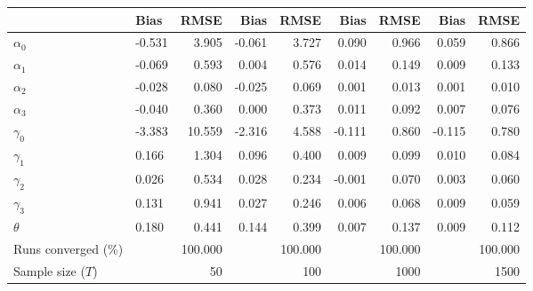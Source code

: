 
\begin{tabular}[t]{llrrrrrrr}
\toprule
  & Bias & RMSE & Bias & RMSE & Bias & RMSE & Bias & RMSE\\
\midrule
$\alpha_{0}$ & -0.531 & 3.905 & -0.061 & 3.727 & 0.090 & 0.966 & 0.059 & 0.866\\
$\alpha_{1}$ & -0.069 & 0.593 & 0.004 & 0.576 & 0.014 & 0.149 & 0.009 & 0.133\\
$\alpha_{2}$ & -0.028 & 0.080 & -0.025 & 0.069 & 0.001 & 0.013 & 0.001 & 0.010\\
$\alpha_{3}$ & -0.040 & 0.360 & 0.000 & 0.373 & 0.011 & 0.092 & 0.007 & 0.076\\
$\gamma_{0}$ & -3.383 & 10.559 & -2.316 & 4.588 & -0.111 & 0.860 & -0.115 & 0.780\\
$\gamma_{1}$ & 0.166 & 1.304 & 0.096 & 0.400 & 0.009 & 0.099 & 0.010 & 0.084\\
$\gamma_{2}$ & 0.026 & 0.534 & 0.028 & 0.234 & -0.001 & 0.070 & 0.003 & 0.060\\
$\gamma_{3}$ & 0.131 & 0.941 & 0.027 & 0.246 & 0.006 & 0.068 & 0.009 & 0.059\\
$\theta$ & 0.180 & 0.441 & 0.144 & 0.399 & 0.007 & 0.137 & 0.009 & 0.112\\
Runs converged (\%) &  & 100.000 &  & 100.000 &  & 100.000 &  & 100.000\\
Sample size ($T$) &  & 50 &  & 100 &  & 1000 &  & 1500\\
\bottomrule
\end{tabular}
